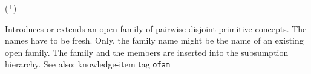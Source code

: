   ($^+$)

Introduces or extends an open family of pairwise disjoint primitive concepts.
The names have to be fresh. Only, the family name might be the name of
an existing open family. The family and the members are inserted into the
subsumption hierarchy.
See also: knowledge-item tag {\tt ofam}



